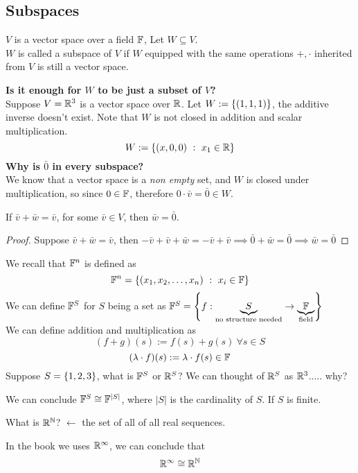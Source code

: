 \subsection{Subspaces}
\begin{definition}
    $V$ is a vector space over a field $\mathbb F$, Let $W \subseteq V$. \\
    $W$ is called a subspace of $V$ if $W$ equipped with the same operations $+, \cdot$ inherited from $V$ is still a vector space.
\end{definition}
\textbf{Is it enough for $W$ to be just a subset of $V$?} \\
Suppose $V = \mathbb R^3$ is a vector space over $\mathbb R$. Let $W := \left\{ (1,1,1) \right\}$, the additive inverse doesn't exist. Note that $W$ is not closed in addition and scalar multiplication. \\
\[W := \left\{ (x,0,0) \ : \ x_1 \in \mathbb R \right\}\]
\textbf{Why is $\bar 0$ in every subspace?} \\
We know that a vector space is a \textit{non empty} set, and $W$ is closed under multiplication, so since $0 \in \mathbb F$, therefore $0 \cdot \bar v = \bar 0 \in W$. 
\begin{remark}
If $\bar v + \bar w = \bar v$, for some $\bar v \in V$, then $\bar w = \bar 0$.
\end{remark}
\begin{proof}
    Suppose $\bar v + \bar w = \bar v$, then $- \bar v + \bar v  +\bar w = - \bar v + \bar v \implies \bar 0 + \bar w = \bar 0 \implies \bar w = \bar 0$
\end{proof}
We recall that $\mathbb F^n$ is defined as 
\[\mathbb F^n = \left\{ ({x}_1,{x}_2, \ldots, {x}_{n})\ : \ x_i \in \mathbb F \right\} \]
We can define $\mathbb F^S$ for $S$ being a set as $\mathbb F^{S} = \left\{ f :  \underbrace{S}_{\text{no structure needed}} \to \underbrace{\mathbb F}_{\text{field}} \right\} $ \\
We can define addition and multiplication as
\[ (f + g)(s) := f(s) + g(s) \ \forall s \in S \]
\[ (\lambda \cdot f)(s) := \lambda \cdot f(s) \in \mathbb F\]
Suppose $S = \left\{ 1,2,3 \right\}$, what is $\mathbb F^S$ or $\mathbb R^S$?
We can thought of $\mathbb R^S$ as $\mathbb R^3$..... why?
\begin{remark}
    We can conclude $\mathbb F^S \cong \mathbb F^{|S|}$, where $|S|$ is the cardinality of $S$. If $S$ is finite.
\end{remark}
What is $\mathbb R^{\mathbb N}$? $\leftarrow$ the set of all of all real sequences.
\begin{remark}
    In the book we uses $\mathbb R^\infty$, we can conclude that \[ \mathbb R^\infty \cong \mathbb R^{\mathbb N} \]
\end{remark}
